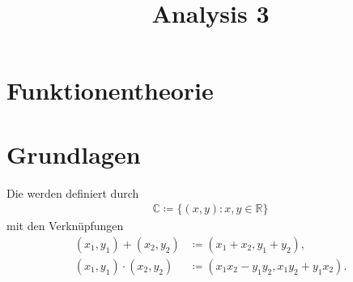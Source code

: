 \documentclass[a4paper,10pt]{scrbook}
\title{Analysis 3}
\begin{document}
\maketitle

\tableofcontents
\newpage


%
%

\setcounter{thmn}{0}
\section{Funktionentheorie}

%
%

\section{Grundlagen}
\addtocounter{thmn}{1}
\setcounter{theorem}{0}

\begin{theorem}[Definition]
  Die  werden definiert durch
  \begin{align*}
    \mathbb{C} \coloneq \{ (x,y) : x,y \in \mathbb{R} \}
  \end{align*}
  mit den Verknüpfungen
  \begin{align*}
    (x_1,y_1) + (x_2,y_2) &\coloneq (x_1 + x_2,y_1 + y_2), \\
    (x_1,y_1) \cdot (x_2,y_2) &\coloneq (x_1 x_2 - y_1 y_2, x_1 y_2 + y_1 x_2).
  \end{align*}
\end{theorem}
\end{document}
